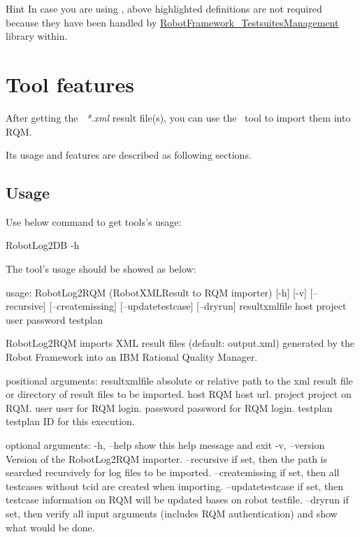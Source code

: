 \begin{boxhint} {Hint}
  In case you are using \rfw, above highlighted definitions are 
  not required because they have been handled by
  \href{https://github.com/test-fullautomation/robotframework-testsuitesmanagement}
  {RobotFramework\_TestsuitesManagement} library within.
\end{boxhint}

\hypertarget{description-tool-features}{%
\section{Tool features}\label{description-tool-features}}

After getting the \rfwcore\ \emph{*.xml} result file(s), you can use the \pkg\ tool to
import them into RQM.

Its usage and features are described as following sections.

\subsection{Usage}
Use below command to get tools's usage:
\begin{robotlog}
RobotLog2DB -h
\end{robotlog}

The tool's usage should be showed as below:
\begin{robotlog}
usage: RobotLog2RQM (RobotXMLResult to RQM importer) [-h] [-v] [--recursive]
                    [--createmissing] [--updatetestcase] [--dryrun]
                    resultxmlfile host project user password testplan

RobotLog2RQM imports XML result files (default: output.xml) generated by the
                  Robot Framework into an IBM Rational Quality Manager.

positional arguments:
resultxmlfile     absolute or relative path to the xml result file
                  or directory of result files to be imported.
host              RQM host url.
project           project on RQM.
user              user for RQM login.
password          password for RQM login.
testplan          testplan ID for this execution.

optional arguments:
-h, --help        show this help message and exit
-v, --version     Version of the RobotLog2RQM importer.
--recursive       if set, then the path is searched recursively for
                  log files to be imported.
--createmissing   if set, then all testcases without tcid are created
                  when importing.
--updatetestcase  if set, then testcase information on RQM will be updated
                  bases on robot testfile.
--dryrun          if set, then verify all input arguments
                  (includes RQM authentication) and show what would be done.
\end{robotlog}

